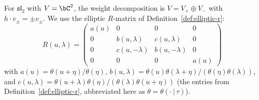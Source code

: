 For $\mathfrak{sl}_2$ with $V = \bC^2$, the weight decomposition
is $V = V_+ \oplus V_-$ with $h \cdot v_\pm = \pm v_\pm$.
We use the elliptic $R$-matrix of Definition~\ref{def:elliptic-r}:
\begin{equation}\label{eq:sl2-r-matrix-entries}
R(u, \lambda) =
\begin{pmatrix}
a(u) & 0 & 0 & 0 \\
0 & b(u, \lambda) & c(u, \lambda) & 0 \\
0 & c(u, -\lambda) & b(u, -\lambda) & 0 \\
0 & 0 & 0 & a(u)
\end{pmatrix}
\end{equation}
with $a(u) = \theta(u+\eta)/\theta(\eta)$,
$b(u,\lambda) = \theta(u)\theta(\lambda+\eta)/\allowbreak
(\theta(\eta)\theta(\lambda))$, and
$c(u,\lambda) = \theta(u+\lambda)\theta(\eta)/\allowbreak
(\theta(\lambda)\theta(u+\eta))$
(the entries from Definition~\ref{def:elliptic-r},
abbreviated here as $\theta = \theta(\cdot\,|\,\tau)$).

